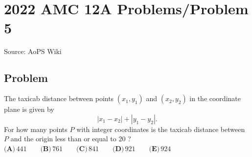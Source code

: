 \documentclass[12pt]{article}
\begin{document}
\section*{{2022 AMC 12A Problems/Problem 5}}
Source: AoPS Wiki

\subsection*{Problem}
The taxicab distance between points $(x_1, y_1)$ and $(x_2, y_2)$ in the coordinate plane is given by \[|x_1 - x_2| + |y_1 - y_2|.\] For how many points $P$ with integer coordinates is the taxicab distance between $P$ and the origin less than or equal to $20$ ? $\textbf{(A)} \, 441 \qquad\textbf{(B)} \, 761 \qquad\textbf{(C)} \, 841 \qquad\textbf{(D)} \, 921 \qquad\textbf{(E)} \, 924$
\end{document}
